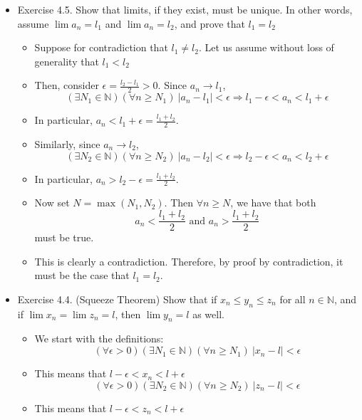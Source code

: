 \documentclass{article}
\begin{document}
\begin{itemize}
\begin{itemize}
\begin{itemize}
\begin{itemize}
            \end{itemize}
        \end{itemize}
    \end{itemize}
    \item Exercise 4.5. Show that limits, if they exist, must be unique. In other words, assume $\lim a_n = l_1$ and $\lim a_n = l_2$, and prove that $l_1 = l_2$
    \begin{itemize}
        \item Suppose for contradiction that $l_1 \neq l_2$. Let us assume without loss of generality that $l_1 < l_2$
        \item Then, consider $\epsilon = \frac{l_2 - l_1}{2} > 0$. Since $a_n \rightarrow l_1$,
        \[
        (\exists N_1 \in \mathbb{N})(\forall n \ge N_1) \ \vert a_n - l_1 \vert < \epsilon \Rightarrow l_1-\epsilon < a_n < l_1 + \epsilon
        \]
        \item In particular, $a_n < l_1 + \epsilon = \frac{l_1 + l_2}{2}$.
        \item Similarly, since $a_n \rightarrow l_2$,
        \[
        (\exists N_2 \in \mathbb{N})(\forall n \ge N_2) \ \vert a_n - l_2 \vert < \epsilon \Rightarrow l_2-\epsilon < a_n < l_2 + \epsilon
        \]
        \item In particular, $a_n > l_2 - \epsilon = \frac{l_1 + l_2}{2}$.
        \item Now set $N = \max(N_1,N_2)$. Then $\forall n \ge N$, we have that both
        \[
        a_n < \frac{l_1+l_2}{2} \text{ and } a_n > \frac{l_1+l_2}{2}
        \]
        must be true.
        \item This is clearly a contradiction. Therefore, by proof by contradiction, it must be the case that $l_1=l_2$.
    \end{itemize}
    \item Exercise 4.4. (Squeeze Theorem) Show that if $x_n \le y_n \le z_n$ for all $n \in \mathbb{N}$, and if $\lim x_n = \lim z_n = l$, then $\lim y_n = l$ as well.
    \begin{itemize}
        \item We start with the definitions:
        \[
        (\forall \epsilon > 0)(\exists N_1 \in \mathbb{N})(\forall n \ge N_1) \ \vert x_n - l \vert < \epsilon
        \]
        \item This means that $l - \epsilon < x_n < l + \epsilon$
        \[
        (\forall \epsilon > 0)(\exists N_2 \in \mathbb{N})(\forall n \ge N_2) \ \vert z_n - l \vert < \epsilon
        \]
        \item This means that $l - \epsilon < z_n < l + \epsilon$

\end{itemize}
\end{itemize}
\end{document}
